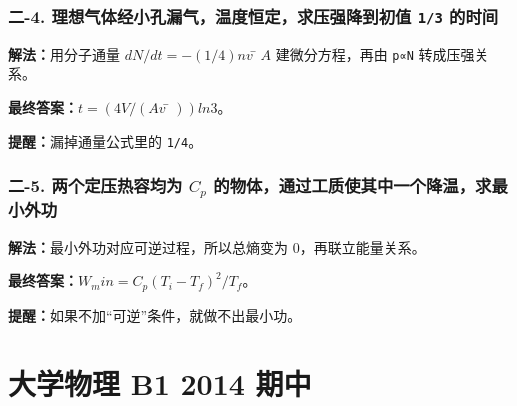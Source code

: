 \documentclass[12pt,a4paper]{ctexart}
\begin{document}
\subsubsection*{二-4. 理想气体经小孔漏气，温度恒定，求压强降到初值 \texttt{1/3} 的时间}
\begin{tcolorbox}[colback=gray!2!white,colframe=black!60,title={题目}]

\end{tcolorbox}
\begin{tcolorbox}[colback=blue!2!white,colframe=blue!55!black,title={完整答案}]
\textbf{解法：}用分子通量 \(dN/dt=-(1/4)n v̄ A\) 建微分方程，再由 \texttt{p∝N} 转成压强关系。\par
\textbf{最终答案：}\(t=(4V/(A v̄))ln3\)。\par

\end{tcolorbox}
\begin{tcolorbox}[colback=red!2!white,colframe=red!55!black,title={易错点}]
\textbf{提醒：}漏掉通量公式里的 \texttt{1/4}。\par
\end{tcolorbox}

\subsubsection*{二-5. 两个定压热容均为 \(C_p\) 的物体，通过工质使其中一个降温，求最小外功}
\begin{tcolorbox}[colback=gray!2!white,colframe=black!60,title={题目}]

\end{tcolorbox}
\begin{tcolorbox}[colback=blue!2!white,colframe=blue!55!black,title={完整答案}]
\textbf{解法：}最小外功对应可逆过程，所以总熵变为 0，再联立能量关系。\par
\textbf{最终答案：}\(W_min=C_p(T_i-T_f)^2/T_f\)。\par

\end{tcolorbox}
\begin{tcolorbox}[colback=red!2!white,colframe=red!55!black,title={易错点}]
\textbf{提醒：}如果不加“可逆”条件，就做不出最小功。\par
\end{tcolorbox}


\clearpage

\section{大学物理 B1 2014 期中}
\end{document}

